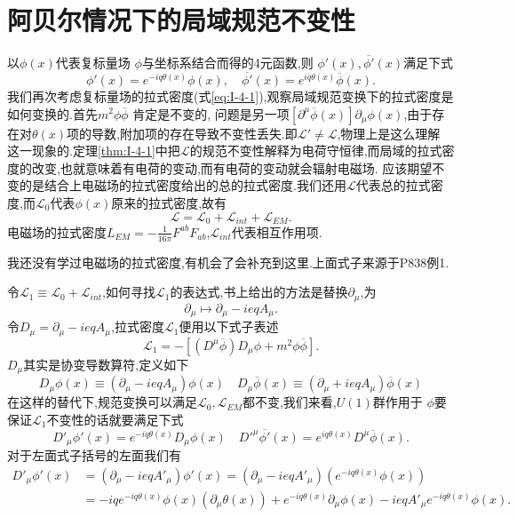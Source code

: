 \documentclass[../main.tex]{subfiles}
\begin{document}
 \section{阿贝尔情况下的局域规范不变性}
 以$\phi(x)$代表复标量场 $\phi$与坐标系结合而得的4元函数,则 $\phi'(x),\overline{\phi'}(x)$满足下式
\[
  \phi'(x) = e^{-iq\theta(x)}\phi(x), \quad \overline{\phi'}(x) = e^{iq \theta(x)}\overline{\phi}(x)
.\] 
我们再次考虑复标量场的拉式密度(式\ref{eq:I-4-1}),观察局域规范变换下的拉式密度是如何变换的.首先$m^2\phi \overline{\phi}$ 肯定是不变的,
问题是另一项$[\partial^\mu \overline{\phi}(x)]\partial_\mu\phi(x)$,由于存在对$\theta(x)$项的导数,附加项的存在导致不变性丢失.即$\mathscr{L}' \neq \mathscr{L}$,物理上是这么理解
这一现象的.定理\ref{thm:I-4-1}中把$\mathscr{L}$的规范不变性解释为电荷守恒律,而局域的拉式密度的改变,也就意味着有电荷的变动,而有电荷的变动就会辐射电磁场.
应该期望不变的是结合上电磁场的拉式密度给出的总的拉式密度.我们还用$\mathscr{L}$代表总的拉式密度,而$\mathscr{L}_0$代表$\phi(x)$原来的拉式密度,故有 \[
  \mathscr{L} = \mathscr{L}_0 + \mathscr{L}_{int} + \mathscr{L}_{EM}
.\] 
电磁场的拉式密度$L_{EM} = - \frac{1}{16\pi}F^{ab}F_{ab}$,$\mathscr{L}_{int}$代表相互作用项.
\begin{note}
  我还没有学过电磁场的拉式密度,有机会了会补充到这里.上面式子来源于P838例1.%
\end{note}
 令$\mathscr{L}_1 \equiv \mathscr{L}_0 + \mathscr{L}_{int}$,如何寻找$\mathscr{L}_1$的表达式,书上给出的方法是替换$\partial_\mu$,为 \[
 \partial_\mu \mapsto \partial_\mu - ieqA_\mu
 .\] 
 令$D_\mu = \partial_\mu - ieq A_\mu$,拉式密度$\mathscr{L}_1$便用以下式子表述 \[
 \mathscr{L}_1 = -[(D^\mu \overline{\phi})D_\mu \phi + m^2 \phi \overline{\phi}]
 .\] 
 $D_\mu$其实是协变导数算符,定义如下
 \begin{equation}
 \label{eq:I-5-1} 
 D_\mu\phi(x) \equiv (\partial_\mu - ieqA_\mu)\phi(x)\quad D_\mu \overline{\phi}(x) \equiv (\partial_\mu + ieq A_\mu)\overline{\phi}(x)
 \end{equation}
 在这样的替代下,规范变换可以满足$\mathscr{L}_0,\mathscr{L}_{EM}$都不变,我们来看,$U(1)$群作用于 $\phi$要保证$\mathscr{L}_1$不变性的话就要满足下式 \[
 D'_\mu \phi'(x) = e^{-iq\theta(x)}D_\mu\phi(x)
 \quad D'^\mu \overline{\phi'}(x) = e^{iq\theta(x)}D^\mu \overline{\phi}(x)
 .\] 
 对于左面式子括号的左面我们有
 \begin{align*}
 D'_\mu \phi'(x) &= (\partial_\mu - ieq A'_\mu)\phi'(x) = (\partial_\mu -i eq A'_\mu)(e^{-iq\theta(x)}\phi(x))\\
                 & = -iq e^{-iq\theta(x)}\phi(x)(\partial_\mu \theta(x)) + e^{-iq\theta(x)}\partial_\mu \phi(x) -ieqA'_\mu e^{-iq \theta(x)}\phi(x)
 .\end{align*}
\end{document}
